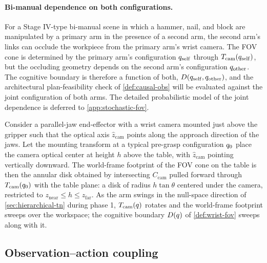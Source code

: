 \paragraph{Bi-manual dependence on both configurations.}
For a Stage IV-type bi-manual scene in which a hammer, nail, and
block are manipulated by a primary arm in the presence of a
second arm, the second arm's links can occlude the workpiece
from the primary arm's wrist camera. The FOV cone is determined
by the primary arm's configuration $q_{\mathrm{self}}$
through $T_{\mathrm{cam}}(q_{\mathrm{self}})$, but the
occluding geometry depends on the second arm's configuration
$q_{\mathrm{other}}$. The cognitive boundary is
therefore a function of both,
$D(q_{\mathrm{self}}, q_{\mathrm{other}})$,
and the architectural plan-feasibility check of
\cref{def:causal-obs} will be evaluated against the joint
configuration of both arms. The detailed probabilistic model of
the joint dependence is deferred to \cref{app:stochastic-fov}.

\begin{example}
\label{ex:wrist-fov-pj}
Consider a parallel-jaw end-effector with a wrist camera mounted
just above the gripper such that the optical axis
$\hat{z}_{\mathrm{cam}}$ points along the approach direction of
the jaws. Let the mounting transform at a typical pre-grasp
configuration $q_{0}$ place the camera optical center at
height $h$ above the table, with $\hat{z}_{\mathrm{cam}}$
pointing vertically downward. The world-frame footprint of the
FOV cone on the table is then the annular disk obtained by
intersecting $C_{\mathrm{cam}}$ pulled forward through
$T_{\mathrm{cam}}(q_{0})$ with the table plane: a disk
of radius $h \tan\theta$ centered under the camera, restricted to
$z_{\mathrm{near}} \le h \le z_{\mathrm{far}}$. As the arm swings
in the null-space direction of \cref{sec:hierarchical-tn} during
phase 1, $T_{\mathrm{cam}}(q)$ rotates and the world-frame
footprint sweeps over the workspace; the cognitive boundary
$D(q)$ of \cref{def:wrist-fov} sweeps along with it.
\end{example}

\subsection{Observation--action coupling}
\label{sec:obs-action-coupling}

